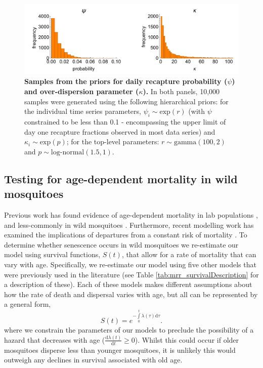 \documentclass[12pt]{article}
\begin{document}
\begin{figure}[h]
	\centerline{\includegraphics[width=1\textwidth]{./Figure_files/mrr_priors_PsiKappa.pdf}}
	\caption{\textbf{Samples from the priors for daily recapture probability ($\psi$) and over-dispersion parameter ($\kappa$).} In both panels, 10,000 samples were generated using the following hierarchical priors: for the individual time series parameters, $\psi_i \sim \text{exp}(r)$ (with $\psi$ constrained to be less than 0.1 - encompassing the upper limit of day one recapture fractions observed in most data series) and $\kappa_i \sim \text{exp}(p)$; for the top-level parameters: $r\sim \text{gamma}(100, 2)$ and $p\sim \text{log-normal}(1.5, 1)$.}\label{fig:mrr_PsiKappaPriors}
\end{figure}

\subsection{Testing for age-dependent mortality in wild mosquitoes}\label{sec:mrr_age_dependence}
Previous work has found evidence of age-dependent mortality in lab populations \citep{styer2007mosquitoes,dawes2009anopheles}, and less-commonly in wild mosquitoes \citep{clements1981analysis}. Furthermore, recent modelling work has examined the implications of departures from a constant risk of mortality \citep{styer2007mosquitoes,hancock2009age,novoseltsev2012age}. To determine whether senescence occurs in wild mosquitoes we re-estimate our model using survival functions, $S(t)$, that allow for a rate of mortality that can vary with age. Specifically, we re-estimate our model using five other models that were previously used in the literature (see Table \ref{tab:mrr_survivalDescription} for a description of these). Each of these models makes different assumptions about how the rate of death and dispersal varies with age, but all can be represented by a general form,
%
\begin{equation}\label{eq:survivalInt}
S(t) = e^{-\int\limits_{0}^{t}\lambda(\tau) \mathrm{d}\tau}.
\end{equation}
%
where we constrain the parameters of our models to preclude the possibility of a hazard that decreases with age ($\frac{\mathrm{d}\lambda(t)}{\mathrm{d}t} \geq 0$). Whilst this could occur if older mosquitoes disperse less than younger mosquitoes, it is unlikely this would outweigh any declines in survival associated with old age.
\end{document}

